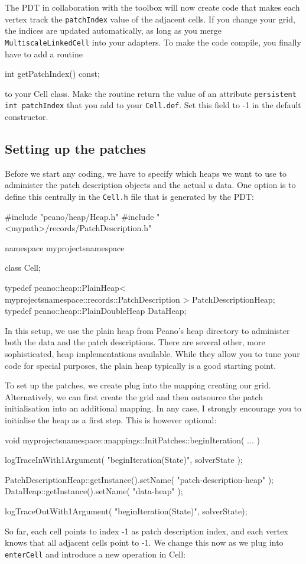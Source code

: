 The PDT in collaboration with the toolbox will now create code that makes each
vertex track the \texttt{patchIndex} value of the adjacent cells.
If you change your grid, the indices are updated automatically, as long as you
merge \texttt{MultiscaleLinkedCell} into your adapters.
To make the code compile, you finally have to add a routine 
\begin{code}
  int getPatchIndex() const;
\end{code}
to your Cell class. 
Make the routine return the value of an attribute \texttt{persistent int 
patchIndex} that you add to your \texttt{Cell.def}.
Set this field to -1 in the default constructor.

\subsection{Setting up the patches}

Before we start any coding, we have to specify which heaps we want to use to
administer the patch description objects and the actual $u$ data.
One option is to define this centrally in the \texttt{Cell.h} file that is
generated by the PDT:
\begin{code}
#include "peano/heap/Heap.h"
#include "<mypath>/records/PatchDescription.h"

namespace myprojectsnamespace { 
  class Cell;
  
  typedef peano::heap::PlainHeap< myprojectsnamespace::records::PatchDescription >  
    PatchDescriptionHeap;
  typedef peano::heap::PlainDoubleHeap                                    DataHeap;
}
\end{code}

\noindent
In this setup, we use the plain heap from Peano's heap directory to administer
both the data and the patch descriptions. 
There are several other, more sophisticated, heap implementations available. 
While they allow you to tune your code for special purposes, the plain heap
typically is a good starting point.

To set up the patches, we create plug into the mapping creating our grid. 
Alternatively, we can first create the grid and then outsource the patch
initialisation into an additional mapping.
In any case, I strongly encourage you to initialise the heap as a first step. 
This is however optional: 
\begin{code}
void myprojectsnamespace::mappings::InitPatches::beginIteration(
  ...
) {
  logTraceInWith1Argument( "beginIteration(State)", solverState );

  PatchDescriptionHeap::getInstance().setName( "patch-description-heap" );
  DataHeap::getInstance().setName( "data-heap" );

  logTraceOutWith1Argument( "beginIteration(State)", solverState);
}
\end{code}
So far, each cell points to index -1 as patch description index, and each vertex
knows that all adjacent cells point to -1. We change this now as we plug into 
\texttt{enterCell} and introduce a new operation in Cell:


